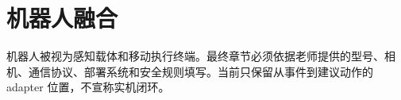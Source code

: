 \section{机器人融合}

机器人被视为感知载体和移动执行终端。最终章节必须依据老师提供的型号、相机、通信协议、部署系统和安全规则填写。当前只保留从事件到建议动作的 adapter 位置，不宣称实机闭环。
